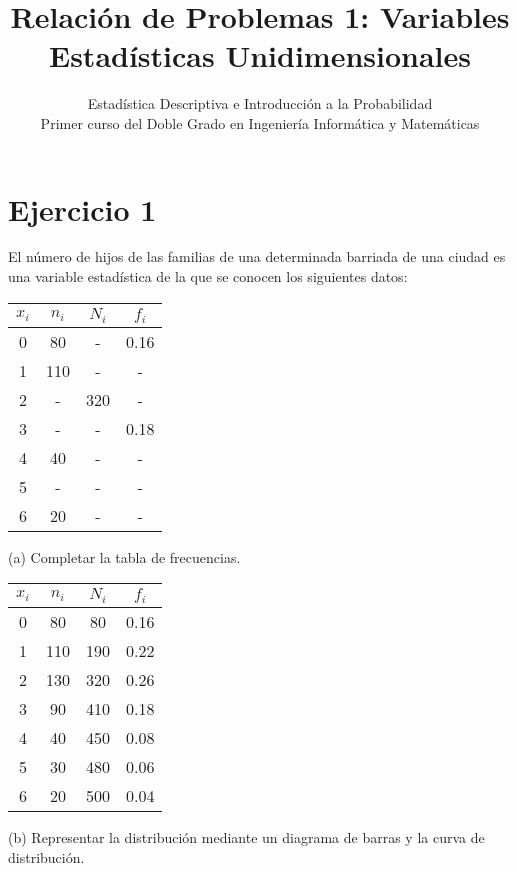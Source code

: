 \documentclass[a4paper,12pt]{article}
\title{Relación de Problemas 1: Variables Estadísticas Unidimensionales}
\author{Estadística Descriptiva e Introducción a la Probabilidad \\ Primer curso del Doble Grado en Ingeniería Informática y Matemáticas}
\date{}
\begin{document}
\maketitle
\section*{Ejercicio 1} El número de hijos de las familias de una determinada barriada de una ciudad es una variable estadística de la que se conocen los siguientes datos: 

\begin{center}
    \begin{tabular}{c|c|c|c}
        $x_i$ & $n_i$ & $N_i$ & $f_i$ \\
        \hline
        0 & 80 & - & 0.16 \\
        1 & 110 & - & - \\
        2 & - & 320 & - \\
        3 & -  & - & 0.18 \\
        4 & 40 &  - & - \\
        5 & -  & - & - \\
        6 & 20 &  - & -\\
    \end{tabular}
\end{center}

(a) Completar la tabla de frecuencias.\\
\begin{center}
    \begin{tabular}{c|c|c|c}
        $x_i$ & $n_i$ & $N_i$ & $f_i$ \\
        \hline
        0 & 80 & 80 & 0.16 \\
        1 & 110 & 190 & 0.22  \\
        2 & 130 & 320 & 0.26  \\
        3 & 90 & 410  & 0.18 \\
        4 & 40 & 450 & 0.08  \\
        5 & 30 & 480 & 0.06  \\
        6 & 20 & 500 & 0.04  \\
    \end{tabular}
\end{center}

(b) Representar la distribución mediante un diagrama de barras y la curva de distribución.\\
\end{document}
